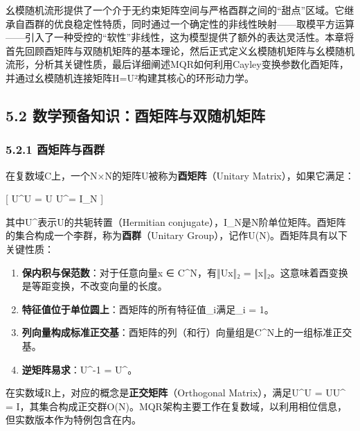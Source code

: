 \documentclass[
  12pt,
]{article}
\providecommand{\tightlist}{%
  \setlength{\itemsep}{0pt}\setlength{\parskip}{0pt}}
\begin{document}
幺模随机流形提供了一个介于无约束矩阵空间与严格酉群之间的``甜点''区域。它继承自酉群的优良稳定性特质，同时通过一个确定性的非线性映射------取模平方运算------引入了一种受控的``软性''非线性，这为模型提供了额外的表达灵活性。本章将首先回顾酉矩阵与双随机矩阵的基本理论，然后正式定义幺模随机矩阵与幺模随机流形，分析其关键性质，最后详细阐述MQR如何利用Cayley变换参数化酉矩阵，并通过幺模随机连接矩阵H=\textbar U\textbar²构建其核心的环形动力学。

\hypertarget{ux6570ux5b66ux9884ux5907ux77e5ux8bc6ux9149ux77e9ux9635ux4e0eux53ccux968fux673aux77e9ux9635}{%
\subsection{5.2
数学预备知识：酉矩阵与双随机矩阵}\label{ux6570ux5b66ux9884ux5907ux77e5ux8bc6ux9149ux77e9ux9635ux4e0eux53ccux968fux673aux77e9ux9635}}

\hypertarget{ux9149ux77e9ux9635ux4e0eux9149ux7fa4}{%
\subsubsection{5.2.1
酉矩阵与酉群}\label{ux9149ux77e9ux9635ux4e0eux9149ux7fa4}}

在复数域C上，一个N×N的矩阵U被称为\textbf{酉矩阵}（Unitary
Matrix），如果它满足：

{[} U\^{}\dagger U = U U\^{}\dagger = I\_N {]}

其中U^{\dagger}表示U的共轭转置（Hermitian
conjugate），I\_N是N阶单位矩阵。酉矩阵的集合构成一个李群，称为\textbf{酉群}（Unitary
Group），记作U(N)。酉矩阵具有以下关键性质：

\begin{enumerate}
\def\labelenumi{\arabic{enumi}.}
\tightlist
\item
  \textbf{保内积与保范数}：对于任意向量x ∈ C\^{}N，有‖Ux‖₂ =
  ‖x‖₂。这意味着酉变换是等距变换，不改变向量的长度。
\item
  \textbf{特征值位于单位圆上}：酉矩阵的所有特征值\lambda\_i满足\textbar \lambda\_i\textbar{}
  = 1。
\item
  \textbf{列向量构成标准正交基}：酉矩阵的列（和行）向量组是C\^{}N上的一组标准正交基。
\item
  \textbf{逆矩阵易求}：U^{-1} = U^{\dagger}。
\end{enumerate}

在实数域R上，对应的概念是\textbf{正交矩阵}（Orthogonal Matrix），满足U^{}U
= UU^{} =
I，其集合构成正交群O(N)。MQR架构主要工作在复数域，以利用相位信息，但实数版本作为特例包含在内。
\end{document}
